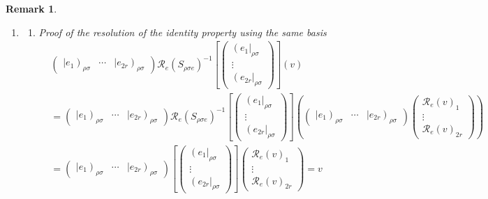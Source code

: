 \documentclass[aps,preprint]{revtex4}
\newtheorem{remark}[theorem]{Remark}
\begin{document}
\begin{remark}
\begin{enumerate}
\item 
\begin{enumerate}
\item Proof of the resolution of the identity property using the same basis 
\begin{align}
& \left( 
\begin{array}{ccc}
\left\vert e_{1}\right) _{\rho \sigma } & \cdots & \left\vert e_{2r}\right)
_{\rho \sigma }%
\end{array}%
\right) \mathcal{R}_{e}\left( S_{\rho \sigma e}\right) ^{-1}\left[ \left( 
\begin{array}{c}
\left( e_{1}\right\vert _{\rho \sigma } \\ 
\vdots \\ 
\left( e_{2r}\right\vert _{\rho \sigma }%
\end{array}%
\right) \right] \left( \overset{}{v}\right) \\
& =\left( 
\begin{array}{ccc}
\left\vert e_{1}\right) _{\rho \sigma } & \cdots & \left\vert e_{2r}\right)
_{\rho \sigma }%
\end{array}%
\right) \mathcal{R}_{e}\left( S_{\rho \sigma e}\right) ^{-1}\left[ \left( 
\begin{array}{c}
\left( e_{1}\right\vert _{\rho \sigma } \\ 
\vdots \\ 
\left( e_{2r}\right\vert _{\rho \sigma }%
\end{array}%
\right) \right] \left( \left( 
\begin{array}{ccc}
\left\vert e_{1}\right) _{\rho \sigma } & \cdots & \left\vert e_{2r}\right)
_{\rho \sigma }%
\end{array}%
\right) \left( 
\begin{array}{c}
\mathcal{R}_{e}\left( v\right) _{1} \\ 
\vdots \\ 
\mathcal{R}_{e}\left( v\right) _{2r}%
\end{array}%
\right) \right) \\
& =\left( 
\begin{array}{ccc}
\left\vert e_{1}\right) _{\rho \sigma } & \cdots & \left\vert e_{2r}\right)
_{\rho \sigma }%
\end{array}%
\right) \left[ \left( 
\begin{array}{c}
\left( e_{1}\right\vert _{\rho \sigma } \\ 
\vdots \\ 
\left( e_{2r}\right\vert _{\rho \sigma }%
\end{array}%
\right) \right] \left( 
\begin{array}{c}
\mathcal{R}_{e}\left( v\right) _{1} \\ 
\vdots \\ 
\mathcal{R}_{e}\left( v\right) _{2r}%
\end{array}%
\right) =v
\end{align}


\end{enumerate}
\end{enumerate}
\end{remark}
\end{document}
